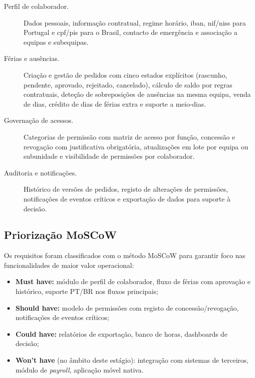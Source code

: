 \documentclass[12pt, a4paper, twoside, openright]{report}
\begin{document}
\begin{description}
  \item[Perfil de colaborador.] Dados pessoais, informação contratual, regime horário,
        \gls{iban}, \gls{nif}/\gls{niss} para Portugal e \gls{cpf}/\gls{pis} para o
        Brasil, contacto de emergência e associação a equipas e subequipas.

  \item[Férias e ausências.] Criação e gestão de pedidos com cinco estados explícitos
        (rascunho, pendente, aprovado, rejeitado, cancelado), cálculo de saldo por
        regras contratuais, deteção de sobreposições de ausências na mesma equipa,
        venda de dias, crédito de dias de férias extra e suporte a meio-dias.

  \item[Governação de acessos.] Categorias de permissão com matriz de acesso por função,
        concessão e revogação com justificativa obrigatória, atualizações em lote por
        equipa ou subunidade e visibilidade de permissões por colaborador.

  \item[Auditoria e notificações.] Histórico de versões de pedidos, registo de alterações
        de permissões, notificações de eventos críticos e exportação de dados para
        suporte à decisão.
\end{description}

\subsection{Priorização MoSCoW}

Os requisitos foram classificados com o método MoSCoW para garantir foco nas
funcionalidades de maior valor operacional:

\begin{itemize}
  \item \textbf{Must have:} módulo de perfil de colaborador, fluxo de férias com
        aprovação e histórico, suporte PT/BR nos fluxos principais;
  \item \textbf{Should have:} modelo de permissões com registo de concessão/revogação,
        notificações de eventos críticos;
  \item \textbf{Could have:} relatórios de exportação, banco de horas, dashboards de decisão;
  \item \textbf{Won't have} (no âmbito deste estágio): integração com sistemas de terceiros,
        módulo de \textit{payroll}, aplicação móvel nativa.
\end{itemize}
\end{document}
